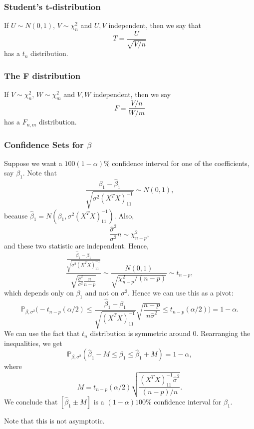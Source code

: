 \documentclass[12pt]{article}
\begin{document}
\subsubsection{Student's t-distribution}
\label{subsub:students_t_distribution}

If $U \sim N(0, 1)$, $V \sim \chi^2_{n}$ and $U, V$ independent, then we say that
\[
	T = \frac{U}{\sqrt{V/n}}
\]
has a $t_n$ distribution.

\subsubsection{The F distribution}
\label{subsub:f_distribution}

If $V \sim \chi^2_{n}$, $W \sim \chi^2_{m}$ and $V, W$ independent, then we say
\[
F = \frac{V/n}{W/m}
\]
has a $F_{n,m}$ distribution.

\subsubsection{Confidence Sets for \texorpdfstring{$\beta$}{Beta}}
\label{subsub:confidence_sets_for_beta}

Suppose we want a $100(1-\alpha)$\% confidence interval for one of the coefficients, say $\beta_1$. Note that
\[
	\frac{\beta_1 - \hat \beta_1}{\sqrt{\sigma^2(X^{T}X)^{-1}_{11}}} \sim N(0, 1),
\]
because $\hat \beta_1 = N(\beta_1, \sigma^2(X^{T}X)^{-1}_{11})$. Also,
\[
\frac{\hat \sigma^2}{\sigma^2} n \sim \chi^2_{n-p},
\]
and these two statistic are independent. Hence,
\[
	\frac{\frac{\hat \beta_1 - \beta_1}{\sqrt{\sigma^2 (X^{T}X)^{-1}_{11}}}}{\sqrt{\frac{\hat \sigma^2}{\sigma^2} \frac{n}{n-p}}} \sim \frac{N(0,1)}{\sqrt{\chi^2_{n-p}/(n-p)}} \sim t_{n-p},
\]
which depends only on $\beta_1$ and not on $\sigma^2$. Hence we can use this as a pivot:
\[
\mathbb{P}_{\beta, \sigma^2} \biggl( - t_{n-p}(\alpha/2) \leq \frac{\hat \beta_1 - \beta_1}{\sqrt{(X^{T}X)^{-1}_{11}}} \sqrt{\frac{n-p}{n\hat \sigma^2}} \leq t_{n-p}(\alpha/2) \biggr) = 1 - \alpha.
\]
We can use the fact that $t_n$ distribution is symmetric around $0$. Rearranging the inequalities, we get
\[
\mathbb{P}_{\beta, \sigma^2} (\hat \beta_1 - M \leq \beta_1 \leq \hat \beta_1 + M) = 1- \alpha,
\]
where
\[
	M = t_{n-p}(\alpha/2) \sqrt{\frac{(X^{T}X)^{-1}_{11} \hat \sigma^2}{(n-p)/n}}.
\]
We conclude that $[\hat \beta_1 \pm M]$ is a $(1 - \alpha)100$\% confidence interval for $\beta_1$.

Note that this is not asymptotic.
\end{document}
